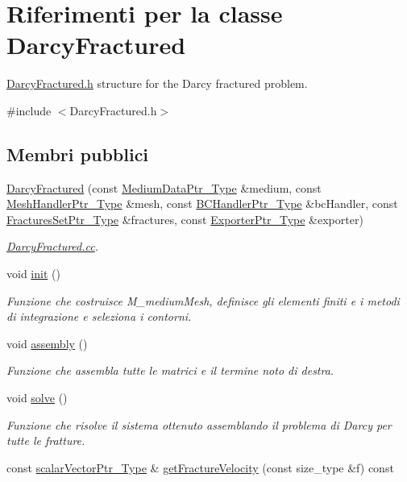 \hypertarget{classDarcyFractured}{\section{Riferimenti per la classe Darcy\-Fractured}
\label{classDarcyFractured}
}


\hyperlink{DarcyFractured_8h}{Darcy\-Fractured.\-h} structure for the Darcy fractured problem.  




{\ttfamily \#include $<$Darcy\-Fractured.\-h$>$}

\subsection*{Membri pubblici}
\begin{DoxyCompactItemize}
\item 
\hyperlink{classDarcyFractured_accc03f979ab787754e26d9f06b553c96}{Darcy\-Fractured} (const \hyperlink{MediumData_8h_ab4e5446269b79f019405fbe1b6e4b1fe}{Medium\-Data\-Ptr\-\_\-\-Type} \&medium, const \hyperlink{MeshHandler_8h_a1e5fc39dfda19e81b21756ab7719ef4c}{Mesh\-Handler\-Ptr\-\_\-\-Type} \&mesh, const \hyperlink{BCHandler_8h_aa175884cb453788647f17f2230a2a762}{B\-C\-Handler\-Ptr\-\_\-\-Type} \&bc\-Handler, const \hyperlink{FracturesSet_8h_ac29a2a91d3af77fb459980a7db47f420}{Fractures\-Set\-Ptr\-\_\-\-Type} \&fractures, const \hyperlink{Exporter_8h_ac9d7f94fea8b91459a536bfaa2f3910c}{Exporter\-Ptr\-\_\-\-Type} \&exporter)
\begin{DoxyCompactList}\small\item\em \hyperlink{DarcyFractured_8cc}{Darcy\-Fractured.\-cc}. \end{DoxyCompactList}\item 
void \hyperlink{classDarcyFractured_a7832c9317b9764da96fc8ee112860824}{init} ()
\begin{DoxyCompactList}\small\item\em Funzione che costruisce M\-\_\-medium\-Mesh, definisce gli elementi finiti e i metodi di integrazione e seleziona i contorni. \end{DoxyCompactList}\item 
void \hyperlink{classDarcyFractured_a1e218bc0eda8f55db644dda95503491b}{assembly} ()
\begin{DoxyCompactList}\small\item\em Funzione che assembla tutte le matrici e il termine noto di destra. \end{DoxyCompactList}\item 
void \hyperlink{classDarcyFractured_a074b6ec717f783c731b2be89f6528cc0}{solve} ()
\begin{DoxyCompactList}\small\item\em Funzione che risolve il sistema ottenuto assemblando il problema di Darcy per tutte le fratture. \end{DoxyCompactList}\item 
const \hyperlink{Core_8h_ab09b6fa3c23db1b8c60456f8690c44a7}{scalar\-Vector\-Ptr\-\_\-\-Type} \& \hyperlink{classDarcyFractured_a7ea359d5998a00804db8fc1ae1f4739a}{get\-Fracture\-Velocity} (const size\-\_\-type \&f) const 
\end{DoxyCompactItemize}


